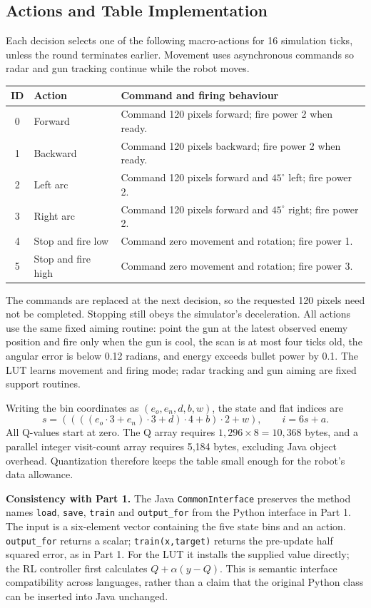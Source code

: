 \documentclass[11pt,letterpaper]{article}
\begin{document}
\newpage
\subsection*{Actions and Table Implementation}
Each decision selects one of the following macro-actions for 16 simulation ticks, unless the round terminates earlier. Movement uses asynchronous commands so radar and gun tracking continue while the robot moves.
\begin{center}\small
\begin{tabular}{clp{3.9in}}
\toprule
ID & Action & Command and firing behaviour \\\midrule
0 & Forward & Command 120 pixels forward; fire power 2 when ready. \\
1 & Backward & Command 120 pixels backward; fire power 2 when ready. \\
2 & Left arc & Command 120 pixels forward and $45^\circ$ left; fire power 2. \\
3 & Right arc & Command 120 pixels forward and $45^\circ$ right; fire power 2. \\
4 & Stop and fire low & Command zero movement and rotation; fire power 1. \\
5 & Stop and fire high & Command zero movement and rotation; fire power 3. \\
\bottomrule
\end{tabular}
\end{center}
The commands are replaced at the next decision, so the requested 120 pixels need not be completed. Stopping still obeys the simulator's deceleration. All actions use the same fixed aiming routine: point the gun at the latest observed enemy position and fire only when the gun is cool, the scan is at most four ticks old, the angular error is below 0.12 radians, and energy exceeds bullet power by 0.1. The LUT learns movement and firing mode; radar tracking and gun aiming are fixed support routines.

Writing the bin coordinates as $(e_o,e_n,d,b,w)$, the state and flat indices are
\[
s=((((e_o\cdot3+e_n)\cdot3+d)\cdot4+b)\cdot2+w),\qquad i=6s+a.
\]
All Q-values start at zero. The Q array requires $1,296\times8=10,368$ bytes, and a parallel integer visit-count array requires 5,184 bytes, excluding Java object overhead. Quantization therefore keeps the table small enough for the robot's data allowance.

\textbf{Consistency with Part 1.} The Java \texttt{CommonInterface} preserves the method names \texttt{load}, \texttt{save}, \texttt{train} and \texttt{output\_for} from the Python interface in Part 1. The input is a six-element vector containing the five state bins and an action. \texttt{output\_for} returns a scalar; \texttt{train(x,target)} returns the pre-update half squared error, as in Part 1. For the LUT it installs the supplied value directly; the RL controller first calculates $Q+\alpha(y-Q)$. This is semantic interface compatibility across languages, rather than a claim that the original Python class can be inserted into Java unchanged.
\end{document}
